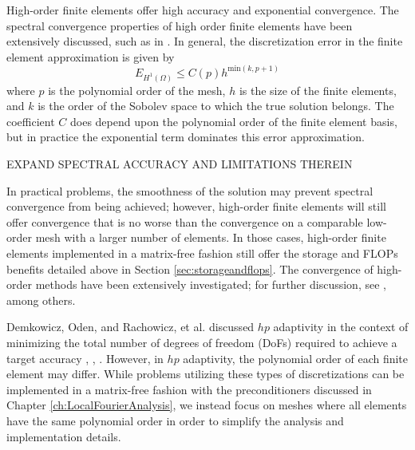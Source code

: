 High-order finite elements offer high accuracy and exponential convergence.
The spectral convergence properties of high order finite elements have been extensively discussed, such as in \cite{guo1986hp}.
In general, the discretization error in the finite element approximation is given by
\begin{equation}
E_{H^1 \left( \Omega \right)} \leq C \left( p \right) h^{\text{min} \left( k, p + 1 \right)}
\label{eq:spectral_convergence}
\end{equation}
where $p$ is the polynomial order of the mesh, $h$ is the size of the finite elements, and $k$ is the order of the Sobolev space to which the true solution belongs.
The coefficient $C$ does depend upon the polynomial order of the finite element basis, but in practice the exponential term dominates this error approximation.

EXPAND SPECTRAL ACCURACY AND LIMITATIONS THEREIN

In practical problems, the smoothness of the solution may prevent spectral convergence from being achieved; however, high-order finite elements will still offer convergence that is no worse than the convergence on a comparable low-order mesh with a larger number of elements.
In those cases, high-order finite elements implemented in a matrix-free fashion still offer the storage and FLOPs benefits detailed above in Section \ref{sec:storageandflops}.
The convergence of high-order methods have been extensively investigated; for further discussion, see \cite{babuska1982rates}, among others.

Demkowicz, Oden, and Rachowicz, et al. discussed $hp$ adaptivity in the context of minimizing the total number of degrees of freedom (DoFs) required to achieve a target accuracy \cite{demkowicz1989toward}, \cite{oden1989toward}, \cite{rachowicz1989toward}.
However, in $hp$ adaptivity, the polynomial order of each finite element may differ.
While problems utilizing these types of discretizations can be implemented in a matrix-free fashion with the preconditioners discussed in Chapter \ref{ch:LocalFourierAnalysis}, we instead focus on meshes where all elements have the same polynomial order in order to simplify the analysis and implementation details.
